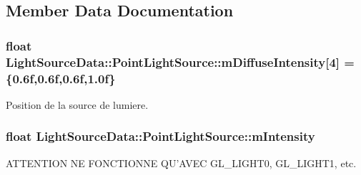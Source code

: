 \subsection{Member Data Documentation}
\hypertarget{struct_light_source_data_1_1_point_light_source_ad13d5b37ea396ed9b299943605f0bf42}{
\subsubsection[{m\+Diffuse\+Intensity}]{\setlength{\rightskip}{0pt plus 5cm}float Light\+Source\+Data\+::\+Point\+Light\+Source\+::m\+Diffuse\+Intensity\mbox{[}4\mbox{]} = \{0.\+6f,0.\+6f,0.\+6f,1.\+0f\}}}\label{struct_light_source_data_1_1_point_light_source_ad13d5b37ea396ed9b299943605f0bf42}


Position de la source de lumiere. 

\hypertarget{struct_light_source_data_1_1_point_light_source_af7c91e317104049245c90bc39cdc9d7c}{
\subsubsection[{m\+Intensity}]{\setlength{\rightskip}{0pt plus 5cm}float Light\+Source\+Data\+::\+Point\+Light\+Source\+::m\+Intensity}}\label{struct_light_source_data_1_1_point_light_source_af7c91e317104049245c90bc39cdc9d7c}


A\+T\+T\+E\+N\+T\+I\+O\+N N\+E F\+O\+N\+C\+T\+I\+O\+N\+N\+E Q\+U'A\+V\+E\+C G\+L\+\_\+\+L\+I\+G\+H\+T0, G\+L\+\_\+\+L\+I\+G\+H\+T1, etc. 

